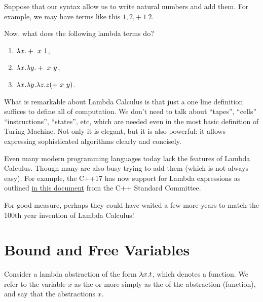 \begin{exercise}
\label{xrcs:lambda::syn::bnf} 
Suppose that our syntax allow us to write natural numbers and add
them.  For example, we may have terms like this $1, 2, +~1~2$.

Now, what does the following lambda terms do?
\begin{enumerate}
\item $\lambda x. +~x~1$,
\item $\lambda x. \lambda y. +~x~y$,
\item $\lambda x. \lambda y. \lambda z.  z (+~x~y)$.
\end{enumerate}
\end{exercise}


\begin{gram}[Summary]
\label{grm:lambda::syn::summary} 
What is remarkable about Lambda Calculus is that just a one line definition suffices to define all of computation.
%
We don't need to talk about ``tapes'', ``cells'' ``instructions'', ``states'', etc, which are needed even in the most basic definition of Turing Machine.
%
Not only it is  elegant, but it is also powerful: it allows expressing sophisticated algorithms clearly and concisely.
%

\end{gram}

\begin{note}
\label{nt:lambda::syn::pl} 
Even many modern programming languages today lack the features of Lambda Calculus.
%
Though many are also busy trying to add them (which is not always easy).
%
For example,
the C++17 has now support for Lambda expressions as outlined 
%
\href{http://www.open-std.org/jtc1/sc22/wg21/docs/papers/2016/p0170r1.pdf}
{in this document}
%
from the C++ Standard Committee.

For good measure, perhaps they could have waited a few more
years to match the 100th year invention of Lambda Calculus!
\end{note}


\section{Bound and Free Variables}
\label{sec:lambda::variables}

\begin{definition}
Consider a lambda abstraction of the form $\lambda x. t$, which denotes a
function.
%
We refer to the variable $x$ as the  or more
simply as the  of the abstraction (function),
%
and
%
say that the abstractions  $x$.
%
\end{definition}

